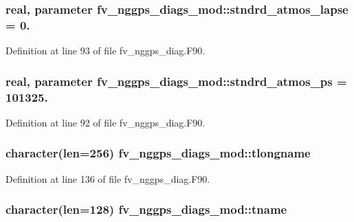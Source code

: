 \subsubsection[{stndrd\-\_\-atmos\-\_\-lapse}]{\setlength{\rightskip}{0pt plus 5cm}real, parameter fv\-\_\-nggps\-\_\-diags\-\_\-mod\-::stndrd\-\_\-atmos\-\_\-lapse = 0.\hspace{0.3cm}{\ttfamily [private]}}\label{classfv__nggps__diags__mod_ac448721091d8e09234e09b5e3e4d0d68}


Definition at line 93 of file fv\-\_\-nggps\-\_\-diag.\-F90.

\subsubsection[{stndrd\-\_\-atmos\-\_\-ps}]{\setlength{\rightskip}{0pt plus 5cm}real, parameter fv\-\_\-nggps\-\_\-diags\-\_\-mod\-::stndrd\-\_\-atmos\-\_\-ps = 101325.\hspace{0.3cm}{\ttfamily [private]}}\label{classfv__nggps__diags__mod_a67f209631191a0c270db5c26d5613683}


Definition at line 92 of file fv\-\_\-nggps\-\_\-diag.\-F90.

\subsubsection[{tlongname}]{\setlength{\rightskip}{0pt plus 5cm}character(len=256) fv\-\_\-nggps\-\_\-diags\-\_\-mod\-::tlongname\hspace{0.3cm}{\ttfamily [private]}}\label{classfv__nggps__diags__mod_a8acfdda0bd8e8b86b400a86615f1b3ef}


Definition at line 136 of file fv\-\_\-nggps\-\_\-diag.\-F90.

\subsubsection[{tname}]{\setlength{\rightskip}{0pt plus 5cm}character(len=128) fv\-\_\-nggps\-\_\-diags\-\_\-mod\-::tname\hspace{0.3cm}{\ttfamily [private]}}\label{classfv__nggps__diags__mod_ade8a5d09872d5c2ba95c9a9a81e916fe}


